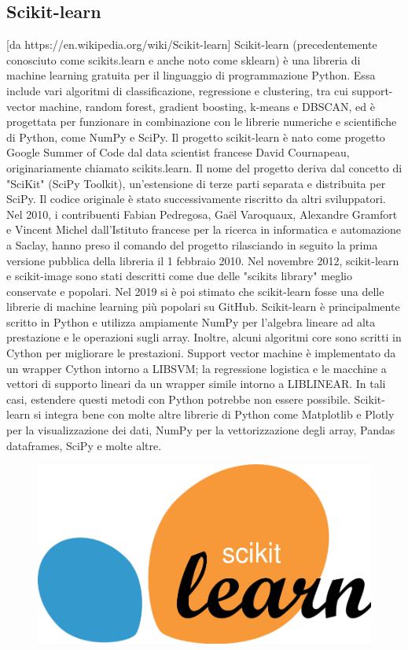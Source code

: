 \subsection{Scikit-learn}
[da https://en.wikipedia.org/wiki/Scikit-learn]
Scikit-learn (precedentemente conosciuto come scikits.learn e anche noto come sklearn) è una libreria di machine learning gratuita per il linguaggio di programmazione Python. 
Essa include vari algoritmi di classificazione, regressione e clustering, tra cui support-vector machine, random forest, gradient boosting, k-means e DBSCAN, ed è progettata per funzionare in combinazione con le librerie numeriche e scientifiche di Python, come NumPy e SciPy. 
Il progetto scikit-learn è nato come progetto Google Summer of Code dal data scientist francese David Cournapeau, originariamente chiamato scikits.learn. Il nome del progetto deriva dal concetto di "SciKit" (SciPy Toolkit), un'estensione di terze parti separata e distribuita per SciPy. 
Il codice originale è stato successivamente riscritto da altri sviluppatori. Nel 2010, i contribuenti Fabian Pedregosa, Gaël Varoquaux, Alexandre Gramfort e Vincent Michel dall'Istituto francese per la ricerca in informatica e automazione a Saclay, hanno preso il comando del progetto rilasciando in  seguito la prima versione pubblica della libreria il 1 febbraio 2010. Nel novembre 2012, scikit-learn e scikit-image sono stati descritti come due delle "scikits library" meglio conservate e popolari. 
Nel 2019 si è poi stimato che scikit-learn fosse una delle librerie di machine learning più popolari su GitHub.
Scikit-learn è principalmente scritto in Python e utilizza ampiamente NumPy per l'algebra lineare ad alta prestazione e le operazioni sugli array. 
Inoltre, alcuni algoritmi core sono scritti in Cython per migliorare le prestazioni. Support vector machine è implementato da un wrapper Cython intorno a LIBSVM; la regressione logistica e le macchine a vettori di supporto lineari da un wrapper simile intorno a LIBLINEAR. In tali casi, estendere questi metodi con Python potrebbe non essere possibile.
Scikit-learn si integra bene con molte altre librerie di Python come Matplotlib e Plotly per la visualizzazione dei dati, NumPy per la vettorizzazione degli array, Pandas dataframes, SciPy e molte altre.

\begin{figure}
    \begin{center}    
        \includegraphics[width=0.7 \linewidth]{images/image9.png}
    \end{center}
\end{figure}

